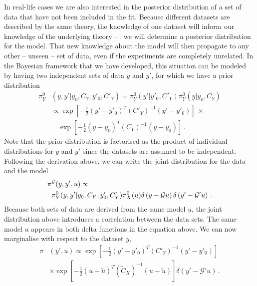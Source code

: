 In real-life cases we are also interested in the posterior distribution of a set
of data that have not been included in the fit. Because different datasets are
described by the same theory, the knowledge of one dataset will inform our
knowledge of the underlying theory -- \ie\ we will determine a posterior
distribution for the model. That new knowledge about the model will then
propagate to any other -- unseen -- set of data, even if the experiments are
completely unrelated. In the Bayesian framework that we have developed, this
situation can be modeled by having two independent sets of data $y$ and $y'$,
for which we have a prior distribution 
\begin{align}
  \label{eq:JointIndepDataPrior}
  \pi_{Y}^0&\left(y,y'|y_0,C_{Y},y'_0,C'_{Y}\right) 
   = \pi_{Y}^0\left(y'|y'_0,C'_{Y}\right) \pi_{Y}^0\left(y|y_0,C_{Y}\right) \nonumber \\
  & \propto 
  \exp\left[-\frac12 \left(y'-y'_0\right)^T (C'_{Y})^{-1} 
  \left(y'-y'_0\right)\right]\,\times \nonumber\\
  &\quad\exp\left[-\frac12 \left(y-y_0\right)^T (C_{Y})^{-1} 
  \left(y-y_0\right)\right]\, .
\end{align}
Note that the prior distribution is factorised as the product of individual
distributions for $y$ and $y'$ since the datasets are assumed to be independent.
Following the derivation above, we can write the joint distribution for the data
and the model 
\begin{align}
  \label{eq:JointModelData}
  \pi&^{\mathcal{G}}(y,y',u) 
  \propto \nonumber \\
  &\pi_{Y}^0(y,y'|y_0,C_{Y},y'_0,C'_{Y}) 
  \pi_{X}^0(u) 
  \delta\left(y - \mathcal{G}u\right)
  \delta\left(y'- \mathcal{G}'u\right)\, .
\end{align}
Because both sets of data are derived from the same model $u$, the joint
distribution above introduces a correlation between the data sets. The same
model $u$ appears in both delta functions in the equation above. We can now
marginalise with respect to the dataset $y$, 
\begin{equation}
  \label{eq:MarginaliseDatasetY}
  \begin{split}
    \pi&(y',u) 
    \propto 
    \exp\left[-\frac12 \left(y'-y'_0\right)^T (C'_{Y})^{-1} 
    \left(y'-y'_0\right)\right]\, \nonumber \\
    &\times \exp\left[-\frac12 \left(u-\tilde{u}\right)^T (\tilde{C}_{X})^{-1} 
    \left(u-\tilde{u}\right)\right] 
     \delta\left(y'- \mathcal{G}'u\right)\, .
  \end{split}
\end{equation}
